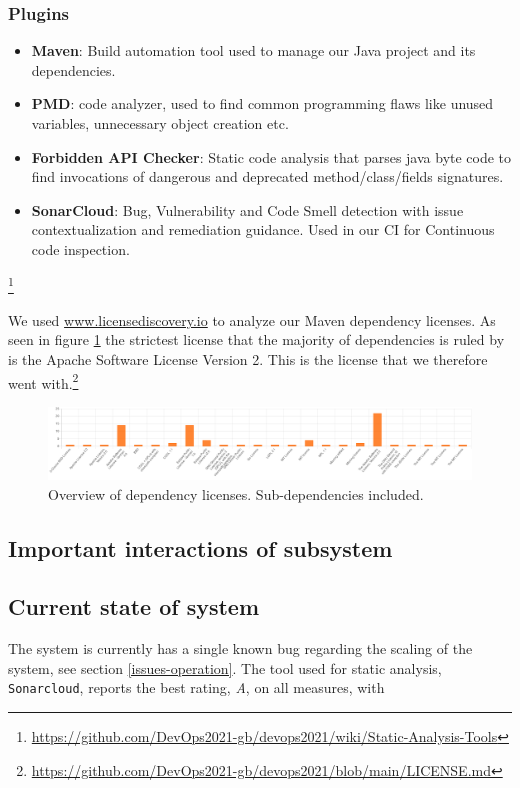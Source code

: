 \subsubsection{Plugins}
\begin{itemize}
    \item \textbf{Maven}: Build automation tool used to manage our Java project and its dependencies.
    \item \textbf{PMD}: code analyzer, used to find common programming flaws like unused variables, unnecessary object creation etc. 
    \item \textbf{Forbidden API Checker}: Static code analysis that parses java byte code to find invocations of dangerous and deprecated method/class/fields signatures. 
    \item \textbf{SonarCloud}: Bug, Vulnerability and Code Smell detection with issue contextualization and remediation guidance. Used in our CI for Continuous code inspection.
\end{itemize}
\footnote{\url{https://github.com/DevOps2021-gb/devops2021/wiki/Static-Analysis-Tools}}



We used \url{www.licensediscovery.io} to analyze our Maven dependency licenses. As seen in figure \ref{fig:licenceDep} the strictest license that the majority of dependencies is ruled by is the Apache Software License Version 2. This is the license that we therefore went with.\footnote{\url{https://github.com/DevOps2021-gb/devops2021/blob/main/LICENSE.md}} 
\begin{figure}[!htb]
    \centering
    \includegraphics[scale=0.2]{images/LicenceDependencies.png}
    \caption{Overview of dependency licenses. Sub-dependencies included.}
    \label{fig:licenceDep}
\end{figure}


\subsection{Important interactions of subsystem}

\subsection{Current state of system}
The system is currently has a single known bug regarding the scaling of the system, see section \ref{issues-operation}. The tool used for static analysis, \texttt{Sonarcloud}, reports the best rating, \textit{A}, on all measures, with 

